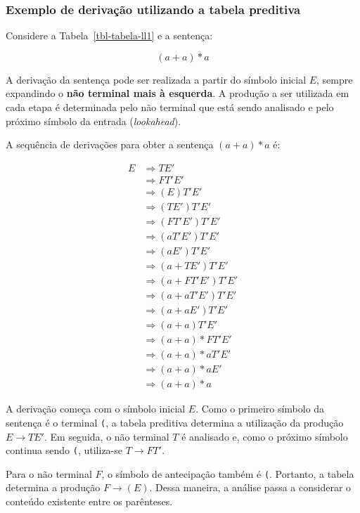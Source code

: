 \documentclass[
  brazilian,
  letterpaper,
]{book}
\theoremstyle{plain}
\theoremstyle{definition}
\theoremstyle{remark}
\begin{document}
\subsubsection{Exemplo de derivação utilizando a tabela
preditiva}\label{exemplo-de-derivauxe7uxe3o-utilizando-a-tabela-preditiva}

Considere a Tabela~\ref{tbl-tabela-ll1} e a sentença:

\[
(a+a)*a
\]

A derivação da sentença pode ser realizada a partir do símbolo inicial
\(E\), sempre expandindo o \textbf{não terminal mais à esquerda}. A
produção a ser utilizada em cada etapa é determinada pelo não terminal
que está sendo analisado e pelo próximo símbolo da entrada
(\emph{lookahead}).

A sequência de derivações para obter a sentença \((a+a)*a\) é:

\[
\begin{aligned}
E
&\Rightarrow TE'\\
&\Rightarrow FT'E'\\
&\Rightarrow (E)T'E'\\
&\Rightarrow (TE')T'E'\\
&\Rightarrow (FT'E')T'E'\\
&\Rightarrow (aT'E')T'E'\\
&\Rightarrow (aE')T'E'\\
&\Rightarrow (a+TE')T'E'\\
&\Rightarrow (a+FT'E')T'E'\\
&\Rightarrow (a+aT'E')T'E'\\
&\Rightarrow (a+aE')T'E'\\
&\Rightarrow (a+a)T'E'\\
&\Rightarrow (a+a)*FT'E'\\
&\Rightarrow (a+a)*aT'E'\\
&\Rightarrow (a+a)*aE'\\
&\Rightarrow (a+a)*a
\end{aligned}
\]

A derivação começa com o símbolo inicial \(E\). Como o primeiro símbolo
da sentença é o terminal \texttt{(}, a tabela preditiva determina a
utilização da produção \(E\rightarrow TE'\). Em seguida, o não terminal
\(T\) é analisado e, como o próximo símbolo continua sendo \texttt{(},
utiliza-se \(T\rightarrow FT'\).

Para o não terminal \(F\), o símbolo de antecipação também é \texttt{(}.
Portanto, a tabela determina a produção \(F\rightarrow(E)\). Dessa
maneira, a análise passa a considerar o conteúdo existente entre os
parênteses.
\end{document}
